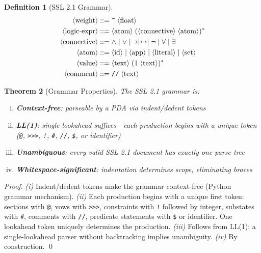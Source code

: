 \documentclass[12pt,a4paper]{article}
\theoremstyle{plain}
\newtheorem{theorem}{Theorem}[section]
\theoremstyle{definition}
\newtheorem{definition}[theorem]{Definition}
\theoremstyle{remark}
\begin{document}
\begin{definition}[SSL 2.1 Grammar]
\begin{align*}
\langle\text{weight}\rangle &::= \texttt{\~{}}\;\langle\text{float}\rangle \\
\langle\text{logic-expr}\rangle &::= \langle\text{atom}\rangle\;(\langle\text{connective}\rangle\;\langle\text{atom}\rangle)^* \\
\langle\text{connective}\rangle &::= \wedge \mid \vee \mid \to \mid \leftrightarrow \mid \neg \mid \forall \mid \exists \\
\langle\text{atom}\rangle &::= \langle\text{id}\rangle \mid \langle\text{app}\rangle \mid \langle\text{literal}\rangle \mid \langle\text{set}\rangle \\
\langle\text{value}\rangle &::= \langle\text{text}\rangle\;(\texttt{|}\;\langle\text{text}\rangle)^* \\
\langle\text{comment}\rangle &::= \texttt{//}\;\langle\text{text}\rangle
\end{align*}
\end{definition}

\begin{theorem}[Grammar Properties]
The SSL 2.1 grammar is:
\begin{enumerate}[(i),nosep]
\item \textbf{Context-free}: parseable by a PDA via indent/dedent tokens
\item \textbf{LL(1)}: single lookahead suffices---each production begins with a unique token (\texttt{@}, \texttt{>>>}, \texttt{!}, \texttt{\#}, \texttt{//}, \texttt{\$}, or identifier)
\item \textbf{Unambiguous}: every valid SSL 2.1 document has exactly one parse tree
\item \textbf{Whitespace-significant}: indentation determines scope, eliminating braces
\end{enumerate}
\end{theorem}

\begin{proof}
\textit{(i)} Indent/dedent tokens make the grammar context-free (Python grammar mechanism). \textit{(ii)} Each production begins with a unique first token: sections with \texttt{@}, vows with \texttt{>>>}, constraints with \texttt{!} followed by integer, substates with \texttt{\#}, comments with \texttt{//}, predicate statements with \texttt{\$} or identifier. One lookahead token uniquely determines the production. \textit{(iii)} Follows from LL(1): a single-lookahead parser without backtracking implies unambiguity. \textit{(iv)} By construction. \qed
\end{proof}
\end{document}
